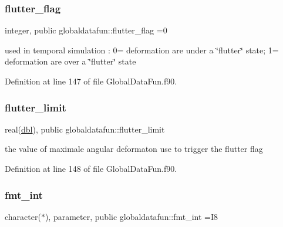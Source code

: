 \mbox{\label{namespaceglobaldatafun_a71be24aec97056093e319698ed6df6fd}} 
\subsubsection{\texorpdfstring{flutter\+\_\+flag}{flutter\_flag}}
{\footnotesize\ttfamily integer, public globaldatafun\+::flutter\+\_\+flag =0}



used in temporal simulation \+: 0= deformation are under a \char`\"{}flutter\char`\"{} state; 1= deformation are over a \char`\"{}flutter\char`\"{} state 



Definition at line 147 of file Global\+Data\+Fun.\+f90.

\mbox{\label{namespaceglobaldatafun_a00437dc044a340393bafc8c15d696e7a}} 
\subsubsection{\texorpdfstring{flutter\+\_\+limit}{flutter\_limit}}
{\footnotesize\ttfamily real(\hyperlink{namespaceglobaldatafun_a5008801201dd34f2af8eae07756befb4}{dbl}), public globaldatafun\+::flutter\+\_\+limit}



the value of maximale angular deformaton use to trigger the flutter flag 



Definition at line 148 of file Global\+Data\+Fun.\+f90.

\mbox{\label{namespaceglobaldatafun_a9636e338fbbaf3b710c9483f5ba825ad}} 
\subsubsection{\texorpdfstring{fmt\+\_\+int}{fmt\_int}}
{\footnotesize\ttfamily character($\ast$), parameter, public globaldatafun\+::fmt\+\_\+int =\textquotesingle{}I8\textquotesingle{}}



